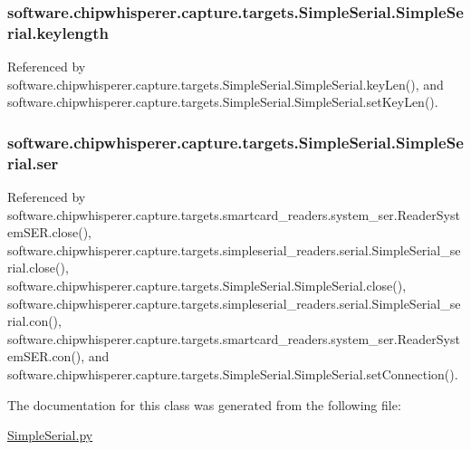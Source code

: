 \subsubsection[{keylength}]{\setlength{\rightskip}{0pt plus 5cm}software.\+chipwhisperer.\+capture.\+targets.\+Simple\+Serial.\+Simple\+Serial.\+keylength}\label{classsoftware_1_1chipwhisperer_1_1capture_1_1targets_1_1SimpleSerial_1_1SimpleSerial_a5a2974d7c715f6489143f8a93c32e152}


Referenced by software.\+chipwhisperer.\+capture.\+targets.\+Simple\+Serial.\+Simple\+Serial.\+key\+Len(), and software.\+chipwhisperer.\+capture.\+targets.\+Simple\+Serial.\+Simple\+Serial.\+set\+Key\+Len().

\hypertarget{classsoftware_1_1chipwhisperer_1_1capture_1_1targets_1_1SimpleSerial_1_1SimpleSerial_a5cc31149b367e10d3bcb9b80750d2cf4}{}
\subsubsection[{ser}]{\setlength{\rightskip}{0pt plus 5cm}software.\+chipwhisperer.\+capture.\+targets.\+Simple\+Serial.\+Simple\+Serial.\+ser}\label{classsoftware_1_1chipwhisperer_1_1capture_1_1targets_1_1SimpleSerial_1_1SimpleSerial_a5cc31149b367e10d3bcb9b80750d2cf4}


Referenced by software.\+chipwhisperer.\+capture.\+targets.\+smartcard\+\_\+readers.\+system\+\_\+ser.\+Reader\+System\+S\+E\+R.\+close(), software.\+chipwhisperer.\+capture.\+targets.\+simpleserial\+\_\+readers.\+serial.\+Simple\+Serial\+\_\+serial.\+close(), software.\+chipwhisperer.\+capture.\+targets.\+Simple\+Serial.\+Simple\+Serial.\+close(), software.\+chipwhisperer.\+capture.\+targets.\+simpleserial\+\_\+readers.\+serial.\+Simple\+Serial\+\_\+serial.\+con(), software.\+chipwhisperer.\+capture.\+targets.\+smartcard\+\_\+readers.\+system\+\_\+ser.\+Reader\+System\+S\+E\+R.\+con(), and software.\+chipwhisperer.\+capture.\+targets.\+Simple\+Serial.\+Simple\+Serial.\+set\+Connection().



The documentation for this class was generated from the following file\+:\begin{DoxyCompactItemize}
\item 
\hyperlink{SimpleSerial_8py}{Simple\+Serial.\+py}\end{DoxyCompactItemize}
